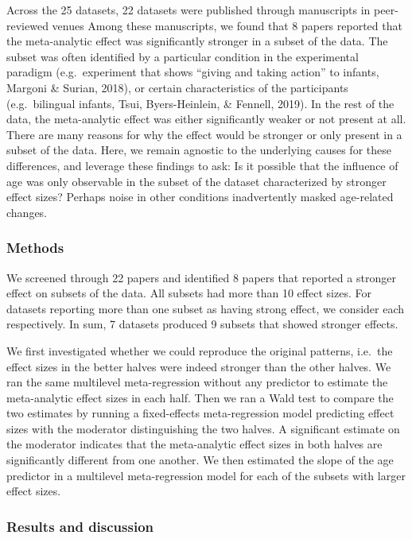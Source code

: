 \documentclass[
  man]{apa6}
\begin{document}
Across the 25 datasets, 22 datasets were published through manuscripts in peer-reviewed venues Among these manuscripts, we found that 8 papers reported that the meta-analytic effect was significantly stronger in a subset of the data. The subset was often identified by a particular condition in the experimental paradigm (e.g.~experiment that shows ``giving and taking action'' to infants, Margoni \& Surian, 2018), or certain characteristics of the participants (e.g.~bilingual infants, Tsui, Byers-Heinlein, \& Fennell, 2019). In the rest of the data, the meta-analytic effect was either significantly weaker or not present at all. There are many reasons for why the effect would be stronger or only present in a subset of the data. Here, we remain agnostic to the underlying causes for these differences, and leverage these findings to ask: Is it possible that the influence of age was only observable in the subset of the dataset characterized by stronger effect sizes? Perhaps noise in other conditions inadvertently masked age-related changes.

\hypertarget{methods-3}{%
\subsubsection{Methods}\label{methods-3}}

We screened through 22 papers and identified 8 papers that reported a stronger effect on subsets of the data. All subsets had more than 10 effect sizes. For datasets reporting more than one subset as having strong effect, we consider each respectively. In sum, 7 datasets produced 9 subsets that showed stronger effects.

We first investigated whether we could reproduce the original patterns, i.e.~the effect sizes in the better halves were indeed stronger than the other halves. We ran the same multilevel meta-regression without any predictor to estimate the meta-analytic effect sizes in each half. Then we ran a Wald test to compare the two estimates by running a fixed-effects meta-regression model predicting effect sizes with the moderator distinguishing the two halves. A significant estimate on the moderator indicates that the meta-analytic effect sizes in both halves are significantly different from one another. We then estimated the slope of the age predictor in a multilevel meta-regression model for each of the subsets with larger effect sizes.

\hypertarget{results-and-discussion-2}{%
\subsubsection{Results and discussion}\label{results-and-discussion-2}}
\end{document}
